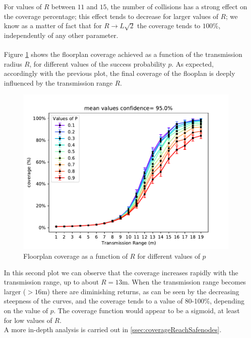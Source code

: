\noindent
For values of $R$ between $11$ and $15$, the number of collisions has a strong
effect on the coverage percentage; this effect tends to decrease for larger
values of $R$; we know as a matter of fact that for $R \to L\sqrt{2}$ the
coverage tends to $100$\%, independently of any other parameter.\\
\\
Figure \ref{fig:coverageRP} shows the floorplan coverage achieved as a
function of the transmission radius $R$, for different values of the success
probability $p$. As expected, accordingly with the previous plot, the final
coverage of the flooplan is deeply influenced by the transmission range $R$.
\begin{figure}[H]
    \begin{center}
        \includegraphics[scale=.75,trim={0 0 0 0.8cm},clip]{img/big_coverage_r_mean_95.0.pdf}
    \end{center}
    \vspace*{-0.5cm}
    \caption{Floorplan coverage as a function of $R$ for different values of $p$}
    \label{fig:coverageRP}
\end{figure}
\noindent
In this second plot we can observe that the coverage increases rapidly with the
transmission range, up to about $R=13$m. When the transmission range becomes
larger ($> 16$m) there are diminishing returns, as can be seen by the decreasing
steepness of the curves, and the coverage tends to a value of 80-100\%,
depending on the value of $p$. The coverage function would appear to be a
sigmoid, at least for low values of $R$.\\
A more in-depth analysis is carried out in \ref{ssec:coverageReachSafenodes}.
